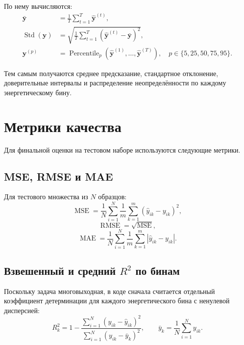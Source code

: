 \documentclass[11pt]{article}
\begin{document}
По нему вычисляются:
\begin{align}
\bar{\mathbf{y}} &= \frac{1}{T} \sum_{t=1}^{T} \hat{\mathbf{y}}^{(t)},\\
\operatorname{Std}(\mathbf{y}) &= \sqrt{\frac{1}{T} \sum_{t=1}^{T} \left(\hat{\mathbf{y}}^{(t)} - \bar{\mathbf{y}}\right)^2},\\
\mathbf{y}^{(p)} &= \operatorname{Percentile}_p\left(\hat{\mathbf{y}}^{(1)},\dots,\hat{\mathbf{y}}^{(T)}\right), \quad p \in \{5,25,50,75,95\}.
\end{align}

Тем самым получаются среднее предсказание, стандартное отклонение, доверительные интервалы и распределение неопределённости по каждому энергетическому бину.

\section{Метрики качества}

Для финальной оценки на тестовом наборе используются следующие метрики.

\subsection{MSE, RMSE и MAE}

Для тестового множества из $N$ образцов:
\begin{equation}
\operatorname{MSE} = \frac{1}{N} \sum_{i=1}^{N} \frac{1}{m} \sum_{k=1}^{m} (\hat{y}_{ik} - y_{ik})^2,
\end{equation}
\begin{equation}
\operatorname{RMSE} = \sqrt{\operatorname{MSE}},
\end{equation}
\begin{equation}
\operatorname{MAE} = \frac{1}{N} \sum_{i=1}^{N} \frac{1}{m} \sum_{k=1}^{m} |\hat{y}_{ik} - y_{ik}|.
\end{equation}

\subsection{Взвешенный и средний \texorpdfstring{$R^2$}{R2} по бинам}

Поскольку задача многовыходная, в коде сначала считается отдельный коэффициент детерминации для каждого энергетического бина с ненулевой дисперсией:
\begin{equation}
R_k^2 = 1 - \frac{\sum_{i=1}^{N}(y_{ik} - \hat{y}_{ik})^2}{\sum_{i=1}^{N}(y_{ik} - \bar{y}_{k})^2},
\qquad
\bar{y}_k = \frac{1}{N} \sum_{i=1}^{N} y_{ik}.
\end{equation}
\end{document}
